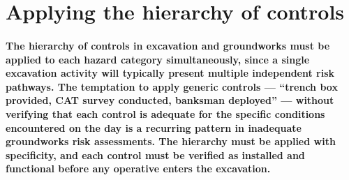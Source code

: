 \section{Applying the hierarchy of controls}

\paragraph{The hierarchy of controls in excavation and groundworks must be applied to each hazard category simultaneously, since a single excavation activity will typically present multiple independent risk pathways. The temptation to apply generic controls --- ``trench box provided, CAT survey conducted, banksman deployed'' --- without verifying that each control is adequate for the specific conditions encountered on the day is a recurring pattern in inadequate groundworks risk assessments. The hierarchy must be applied with specificity, and each control must be verified as installed and functional before any operative enters the excavation.}

